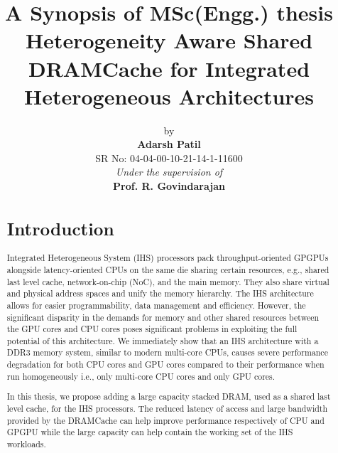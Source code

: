 \documentclass[12pt,a4paper]{report}
\title{A Synopsis of MSc(Engg.) thesis \\ 
 \textbf{Heterogeneity Aware Shared DRAMCache for Integrated Heterogeneous Architectures}}
\author{ by\\ \vspace{2mm} \textbf{Adarsh Patil}\\SR No: 04-04-00-10-21-14-1-11600\\ 
\vspace{2mm} \textit {Under the supervision of}\\\vspace{2mm} \textbf{Prof. R. Govindarajan}}
\affil{Department of Computer Science and Automation,\\
Indian Institute of Science, Bangalore}
\begin{document}
\maketitle


\begin{abstract}

\section*{Introduction}
Integrated Heterogeneous System (IHS) processors pack throughput-oriented GPGPUs alongside latency-oriented CPUs on the same die sharing certain resources, e.g., shared last level cache, network-on-chip (NoC), and the main memory. They also share virtual and physical address spaces and unify the memory hierarchy. The IHS architecture allows for easier programmability, data management and efficiency. However, the significant disparity in the demands for memory and other shared resources between the GPU cores and CPU cores poses significant problems in exploiting the full potential of this architecture. We immediately show that an IHS architecture with a DDR3 memory system, similar to modern multi-core CPUs, causes severe performance degradation for both CPU cores and GPU cores compared to their performance when run homogeneously i.e., only multi-core CPU cores and only GPU cores.
\par In this thesis, we propose adding a large capacity stacked DRAM, used as a shared last level cache, for the IHS processors. The reduced latency of access and large bandwidth provided by the DRAMCache can help improve performance respectively of CPU and GPGPU while the large capacity can help contain the working set of the IHS workloads. 

\end{abstract}
\end{document}

